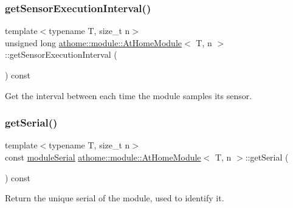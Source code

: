\subsubsection{\texorpdfstring{get\+Sensor\+Execution\+Interval()}{getSensorExecutionInterval()}}
{\footnotesize\ttfamily template$<$typename T, size\+\_\+t n$>$ \\
unsigned long \mbox{\hyperlink{classathome_1_1module_1_1_at_home_module}{athome\+::module\+::\+At\+Home\+Module}}$<$ T, n $>$\+::get\+Sensor\+Execution\+Interval (\begin{DoxyParamCaption}{ }\end{DoxyParamCaption}) const\hspace{0.3cm}{\ttfamily [inline]}}

Get the interval between each time the module samples its sensor. \mbox{\label{classathome_1_1module_1_1_at_home_module_a1267bc33e38b25ba52bceddc60ea7df1}} 
\subsubsection{\texorpdfstring{get\+Serial()}{getSerial()}}
{\footnotesize\ttfamily template$<$typename T, size\+\_\+t n$>$ \\
const \mbox{\hyperlink{classathome_1_1module_1_1_at_home_module_aaa31c8eddb689010ef59deba4e1463c6}{module\+Serial}} \mbox{\hyperlink{classathome_1_1module_1_1_at_home_module}{athome\+::module\+::\+At\+Home\+Module}}$<$ T, n $>$\+::get\+Serial (\begin{DoxyParamCaption}{ }\end{DoxyParamCaption}) const\hspace{0.3cm}{\ttfamily [inline]}}

Return the unique serial of the module, used to identify it. \mbox{\label{classathome_1_1module_1_1_at_home_module_a6186e04da0e46cf463d24947538380bb}} 

